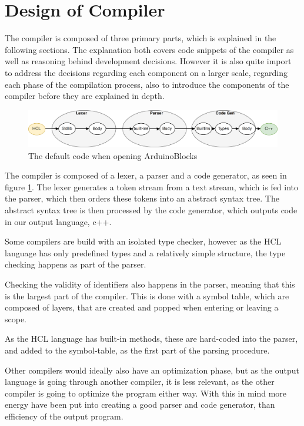 \section{Design of Compiler}
The compiler is composed of three primary parts, which is explained in the following sections.
The explanation both covers code snippets of the compiler as well as reasoning behind development decisions.
However it is also quite import to address the decisions regarding each component on a larger scale, regarding each phase of the compilation process, also to introduce the components of the compiler before they are explained in depth.
\begin{figure}[H]
	\centering
	\includegraphics[width=\textwidth]{4.Solution/images/compiler_process.png}
	\caption{The default code when opening ArduinoBlocks}
	\label{fig:compilerProcess}
\end{figure}


The compiler is composed of a lexer, a parser and a code generator, as seen in figure \ref{fig:compilerProcess}.
The lexer generates a token stream from a text stream, which is fed into the parser, which then orders these tokens into an abstract syntax tree.
The abstract syntax tree is then processed by the code generator, which outputs code in our output language, c++.

Some compilers are build with an isolated type checker, however as the HCL language has only predefined types and a relatively simple structure, the type checking happens as part of the parser.

Checking the validity of identifiers also happens in the parser, meaning that this is the largest part of the compiler.
This is done with a symbol table, which are composed of layers, that are created and popped when entering or leaving a scope.
 
As the HCL language has built-in methods, these are hard-coded into the parser, and added to the symbol-table, as the first part of the parsing procedure.

Other compilers would ideally also have an optimization phase, but as the output language is going through another compiler, it is less relevant, as the other compiler is going to optimize the program either way. 
With this in mind more energy have been put into creating a good parser and code generator, than efficiency of the output program.
